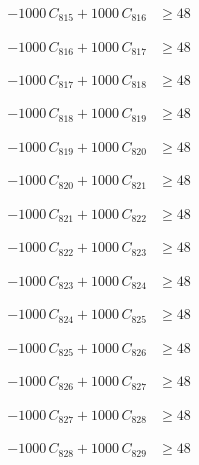 \documentclass[a4paper,11pt]{article}
\begin{document}
\begin{align}
-1000\,C_{815} + 1000\,C_{816} &\geq 48 \nonumber
\end{align}

\begin{align}
-1000\,C_{816} + 1000\,C_{817} &\geq 48 \nonumber
\end{align}

\begin{align}
-1000\,C_{817} + 1000\,C_{818} &\geq 48 \nonumber
\end{align}

\begin{align}
-1000\,C_{818} + 1000\,C_{819} &\geq 48 \nonumber
\end{align}

\begin{align}
-1000\,C_{819} + 1000\,C_{820} &\geq 48 \nonumber
\end{align}

\begin{align}
-1000\,C_{820} + 1000\,C_{821} &\geq 48 \nonumber
\end{align}

\begin{align}
-1000\,C_{821} + 1000\,C_{822} &\geq 48 \nonumber
\end{align}

\begin{align}
-1000\,C_{822} + 1000\,C_{823} &\geq 48 \nonumber
\end{align}

\begin{align}
-1000\,C_{823} + 1000\,C_{824} &\geq 48 \nonumber
\end{align}

\begin{align}
-1000\,C_{824} + 1000\,C_{825} &\geq 48 \nonumber
\end{align}

\begin{align}
-1000\,C_{825} + 1000\,C_{826} &\geq 48 \nonumber
\end{align}

\begin{align}
-1000\,C_{826} + 1000\,C_{827} &\geq 48 \nonumber
\end{align}

\begin{align}
-1000\,C_{827} + 1000\,C_{828} &\geq 48 \nonumber
\end{align}

\begin{align}
-1000\,C_{828} + 1000\,C_{829} &\geq 48 \nonumber
\end{align}
\end{document}
